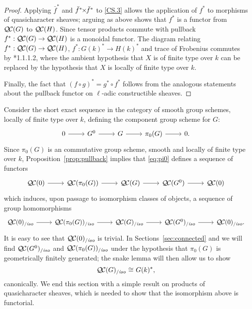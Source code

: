 \documentclass[11pt]{amsart}
\theoremstyle{plain}
\theoremstyle{definition}
\theoremstyle{remark}
\newcommand{\EE}{\mathbb{\bar Q}_\ell}
\newcommand{\Fq}{k}
\DeclareMathOperator{\Hom}{Hom}
\newcommand{\iso}{{\ \cong\ }}
\newcommand{\QC}{{\mathcal{Q\hskip-0.8pt C}}}
\newcommand{\QCiso}[1]{\QC(#1)_{/\textit{iso}}}
\renewcommand{\bf}{\bar{f}}
\newcommand{\tight}[3]{\hspace{-#1pt}{#2}\hspace{-#3pt}}
\begin{document}
\begin{proof}
  Applying $\bf^*$ and $\bf^* \tight{1}{\times}{1}\bf^*$ to \ref{CS.3} allows the application
  of $f^*$ to morphisms of quasicharacter sheaves; arguing as above shows that $f^*$ is
  a functor from $\QC(G)$ to $\QC(H)$.  Since tensor products commute with pullback
  $f^* : \QC(G) \to \QC(H)$ is a monoidal functor.
%
  The diagram relating $f^* : \QC(G) \to \QC(H)$, $f^* : G(k)^* \to H(k)^*$ and trace of Frobenius
  commutes by \cite{laumon:87a}*{1.1.1.2}, where the ambient
  hypothesis that $X$ is of finite type over $\Fq$ can be replaced by
  the hypothesis that $X$ is locally of finite type over $\Fq$.
  
  Finally, the fact that $(f\circ g)^* = g^* \circ f^*$ follows from the analogous
  statements about the pullback functor on $\ell$-adic constructible sheaves.
\end{proof}

Consider the short exact sequence in the category of smooth group
schemes, locally of finite type over $\Fq$, defining the component
group scheme for $G$:
\begin{equation}\label{eq:pi0}
\begin{tikzcd}
0 \rar & G^0 \rar & G \rar & \pi_0(G) \rar & 0.
\end{tikzcd}
\end{equation}
Since $\pi_0(G)$ is an commutative group scheme, smooth and locally of finite type over $\Fq$, 
Proposition~\ref{prop:pullback} implies that \eqref{eq:pi0} defines a sequence of functors
\[
\begin{tikzcd}
\QC(0) \rar & \QC(\pi_0(G)) \rar & \QC(G) \rar & \QC(G^0) \rar & \QC(0)
\end{tikzcd}
\]
which induces, upon passage to isomorphism classes of objects, a sequence of group homomorphisms 
\[
\begin{tikzcd}
\QCiso{0} \rar & \QCiso{\pi_0(G)} \rar & \QCiso{G} \rar & \QCiso{G^0} \rar & \QCiso{0}.
\end{tikzcd}
\]
It is easy to see that $\QCiso{0}$ is trivial. In Sections~\ref{sec:connected} and  we will find $\QCiso{G^0}$
and $\QCiso{\pi_0(G)}$ under the hypothesis that $\pi_0(G)$ is geometrically finitely generated; 
the snake lemma will then allow us to show
\[
\QCiso{G} \iso G(\Fq)^*,%
\]
canonically.
We end this section with a simple result on products of quasicharacter sheaves,
which is needed to show that the isomorphism above is functorial.
\end{document}
